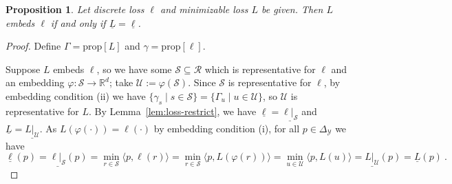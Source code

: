 \documentclass[11pt]{article}
\newcommand{\reals}{\mathbb{R}}
\newcommand{\prop}[1]{\mathrm{prop}[#1]}
\newcommand{\simplex}{\Delta_\Y}
\newcommand{\R}{\mathcal{R}}
\newcommand{\Sc}{\mathcal{S}}
\newcommand{\U}{\mathcal{U}}
\newcommand{\Y}{\mathcal{Y}}
\newcommand{\risk}[1]{\underline{#1}}
\newcommand{\inprod}[2]{\langle #1, #2 \rangle}%
\newtheorem{proposition}{Proposition}
\begin{document}
\begin{proposition}\label{prop:embed-bayes-risks}
  Let discrete loss $\ell$ and minimizable loss $L$ be given.
  Then $L$ embeds $\ell$ if and only if $\risk{L}=\risk{\ell}$.
\end{proposition}
\begin{proof}
  Define $\Gamma = \prop{L}$ and $\gamma = \prop{\ell}$.
  
  Suppose $L$ embeds $\ell$, so we have some $\Sc\subseteq \R$ which is representative for $\ell$ and an embedding $\varphi:\Sc\to\reals^d$; take $\U := \varphi(\Sc)$.
  Since $\Sc$ is representative for $\ell$, by embedding condition (ii) we have $\{\gamma_s \mid s\in\Sc\} = \{\Gamma_u \mid u\in\U\}$, so $\U$ is representative for $L$.
  By Lemma~\ref{lem:loss-restrict}, we have $\risk{\ell} = \risk{\ell|_{\Sc}}$ and $\risk{L} = \risk{L|_{\U}}$.
  As $L(\varphi(\cdot)) = \ell(\cdot)$ by embedding condition (i), for all $p\in\simplex$ we have
  \begin{equation*}
    \risk{\ell}(p) = \risk{\ell|_\Sc}(p) = \min_{r \in \Sc}\inprod{p}{\ell(r)} = \min_{r \in \Sc}\inprod{p}{L(\varphi(r))} = \min_{u \in \U}\inprod{p}{L(u)} = \risk{L|_\U}(p) = \risk{L}(p)~.
  \end{equation*}
  

\end{proof}
\end{document}
